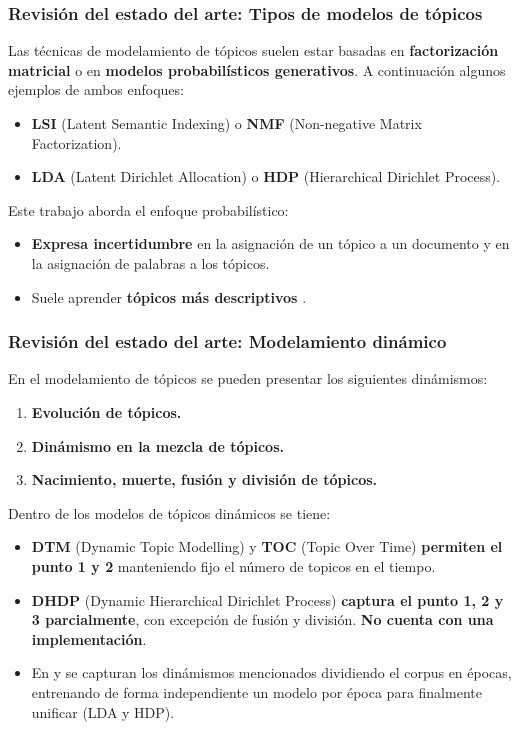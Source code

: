 \documentclass[
	spanish, %
	aspectratio=43, %
	hyperref={pdfencoding=auto,psdextra},
	xcolor={dvipsnames,table,usenames},
]{beamer}
\begin{document}
\begin{frame}[t]
\frametitle{Revisión del estado del arte: Tipos de modelos de tópicos}
Las técnicas de modelamiento de tópicos suelen estar basadas en \textbf{factorización matricial} o en \textbf{modelos probabilísticos generativos}. 
\newline\newline
A continuación algunos ejemplos de ambos enfoques:

\begin{itemize}
  \item \textbf{LSI} (Latent Semantic Indexing) \cite{dumais2004latent} o \textbf{NMF} (Non-negative Matrix Factorization)\cite{xu2003document}. 
  \item \textbf{LDA} (Latent Dirichlet Allocation)\cite{blei2003latent} o \textbf{HDP} (Hierarchical Dirichlet Process)\cite{teh2005sharing}. 
\end{itemize} 

Este trabajo aborda el enfoque probabilístico: 
\begin{itemize}
  \item \textbf{Expresa incertidumbre} en la asignación de un tópico a un documento y en la asignación de palabras a los tópicos.
  \item Suele aprender \textbf{tópicos más descriptivos} \cite{stevens2012exploring}.
\end{itemize}

\end{frame}


\begin{frame}[t]
\frametitle{Revisión del estado del arte: Modelamiento dinámico}
En el modelamiento de tópicos se pueden presentar los siguientes dinámismos:

\begin{enumerate}
  \item \textbf{Evolución de tópicos.}
  \item \textbf{Dinámismo en la mezcla de tópicos.}
  \item \textbf{Nacimiento, muerte, fusión y división de tópicos.}
\end{enumerate}

Dentro de los modelos de tópicos dinámicos se tiene:
\begin{itemize}
  \item \textbf{DTM} (Dynamic Topic Modelling)\cite{blei2006dynamic} y \textbf{TOC} (Topic Over Time)\cite{wang2006topics} \textbf{permiten el punto 1 y 2} manteniendo fijo el número de topicos en el tiempo.
  \item \textbf{DHDP} (Dynamic Hierarchical Dirichlet Process)\cite{ahmed2012timeline} \textbf{captura el punto 1, 2 y 3 parcialmente}, con excepción de fusión y división. \textbf{No cuenta con una implementación}.\\
  \item En \cite{wilson2011tracking} y \cite{beykikhoshk2018discovering} se capturan los dinámismos mencionados dividiendo el corpus en épocas, entrenando de forma independiente un modelo por época para finalmente unificar (LDA y HDP).
\end{itemize}
\end{frame}
\end{document}
